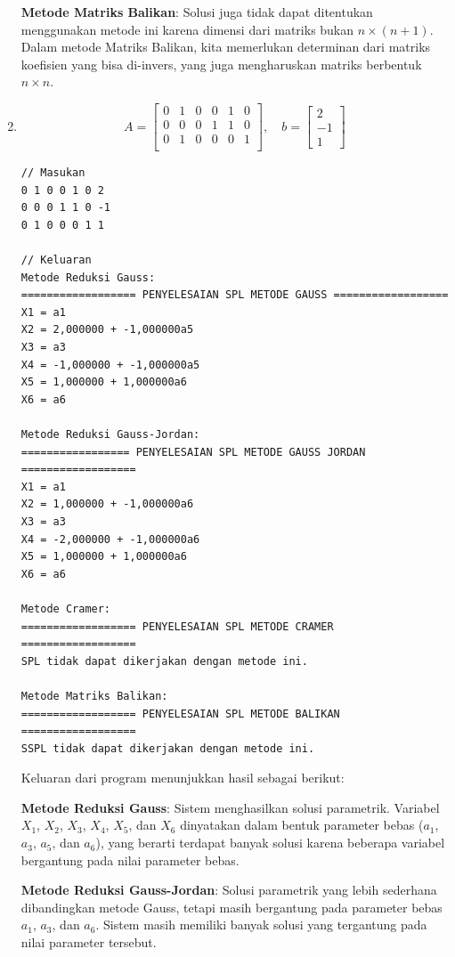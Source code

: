 \begin{enumerate}[label=(\alph*)]
\textbf{Metode Matriks Balikan}: Solusi juga tidak dapat ditentukan menggunakan metode ini karena dimensi dari matriks bukan \(n \times (n+1)\). Dalam metode Matriks Balikan, kita memerlukan determinan dari matriks koefisien yang bisa di-invers, yang juga mengharuskan matriks berbentuk \(n \times n\).

\pagebreak
    \item 
    \[ A = \begin{bmatrix}
    0 & 1 & 0 & 0 & 1 & 0 \\
    0 & 0 & 0 & 1 & 1 & 0 \\
    0 & 1 & 0 & 0 & 0 & 1 \\
\end{bmatrix}, \quad b =
\begin{bmatrix}
    2 \\ -1 \\ 1
\end{bmatrix}\]

\begin{lstlisting}[caption = spl-1c.txt]
// Masukan
0 1 0 0 1 0 2
0 0 0 1 1 0 -1
0 1 0 0 0 1 1

// Keluaran
Metode Reduksi Gauss:
================== PENYELESAIAN SPL METODE GAUSS ==================
X1 = a1
X2 = 2,000000 + -1,000000a5
X3 = a3
X4 = -1,000000 + -1,000000a5
X5 = 1,000000 + 1,000000a6
X6 = a6

Metode Reduksi Gauss-Jordan:
================= PENYELESAIAN SPL METODE GAUSS JORDAN ==================
X1 = a1
X2 = 1,000000 + -1,000000a6
X3 = a3
X4 = -2,000000 + -1,000000a6
X5 = 1,000000 + 1,000000a6
X6 = a6

Metode Cramer:
================== PENYELESAIAN SPL METODE CRAMER ==================
SPL tidak dapat dikerjakan dengan metode ini.

Metode Matriks Balikan:
================== PENYELESAIAN SPL METODE BALIKAN ==================
SSPL tidak dapat dikerjakan dengan metode ini.\end{lstlisting}

Keluaran dari program menunjukkan hasil sebagai berikut:

\textbf{Metode Reduksi Gauss}: Sistem menghasilkan solusi parametrik. Variabel \( X_1 \), \( X_2 \), \( X_3 \), \( X_4 \), \( X_5 \), dan \( X_6 \) dinyatakan dalam bentuk parameter bebas (\( a_1 \), \( a_3 \), \( a_5 \), dan \( a_6 \)), yang berarti terdapat banyak solusi karena beberapa variabel bergantung pada nilai parameter bebas.

\textbf{Metode Reduksi Gauss-Jordan}: Solusi parametrik yang lebih sederhana dibandingkan metode Gauss, tetapi masih bergantung pada parameter bebas \( a_1 \), \( a_3 \), dan \( a_6 \). Sistem masih memiliki banyak solusi yang tergantung pada nilai parameter tersebut.


\end{enumerate}
